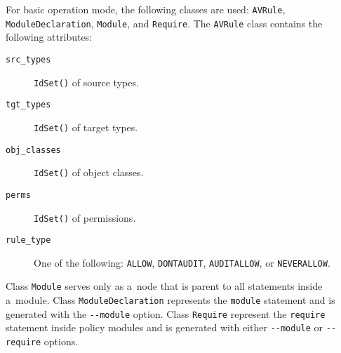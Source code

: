 For basic operation mode, the following classes are used: \texttt{AVRule},
\texttt{ModuleDeclaration}, \texttt{Module}, and \texttt{Require}. The
\texttt{AVRule} class contains the following attributes:
\begin{description}
    \item [\texttt{src\_types}] \texttt{IdSet()} of source types.
    \item [\texttt{tgt\_types}] \texttt{IdSet()} of target types.
    \item [\texttt{obj\_classes}] \texttt{IdSet()} of object classes.
    \item [\texttt{perms}] \texttt{IdSet()} of permissions.
    \item [\texttt{rule\_type}] One of the following: \texttt{ALLOW},
        \texttt{DONTAUDIT}, \texttt{AUDITALLOW}, or \texttt{NEVERALLOW}.
\end{description}
Class \texttt{Module} serves only as a~node that is parent to all statements
inside a~module. Class \texttt{ModuleDeclaration} represents the
\texttt{module} statement and is generated with the \texttt{-{}-module} option.
Class \texttt{Require} represent the \texttt{require} statement inside policy
modules and is generated with either \texttt{-{}-module} or \texttt{-{}-require}
options.

